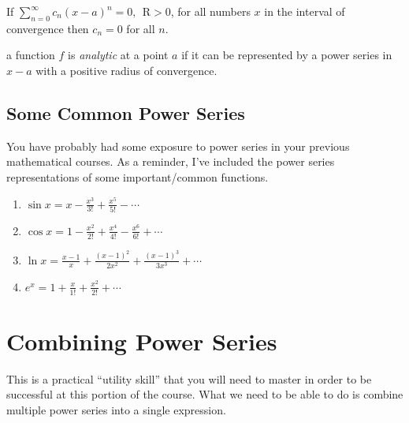 \begin{definition}
If $\sum\limits_{n=0}^{\infty}c_n(x-a)^n=0, \ \ \text{R}>0$, for all numbers $x$ in the interval of convergence then $c_n=0$ for all $n$.
\end{definition}


\begin{definition}
a function $f$ is \emph{analytic} at a point $a$ if it can be represented by a power series in $x-a$ with a positive radius of convergence.
\end{definition}

\subsection{Some Common Power Series}
You have probably had some exposure to power series in your previous mathematical courses.  As a reminder, I've included the power series representations of some important/common functions.

\begin{enumerate}

\item $\sin{x} = x - \frac{x^3}{3!} + \frac{x^5}{5!} - \cdots$

\item $\cos{x} = 1 - \frac{x^2}{2!} + \frac{x^4}{4!} - \frac{x^6}{6!} + \cdots$

\item $\ln{x} = \frac{x-1}{x} + \frac{(x-1)^2}{2x^2} + \frac{(x-1)^3}{3x^3} + \cdots$ 

\item $e^x = 1 + \frac{x}{1!} + \frac{x^2}{2!} + \cdots$
\end{enumerate}


\section{Combining Power Series}
This is a practical ``utility skill'' that you will need to master in order to be successful at this portion of the course.  What we need to be able to do is combine multiple power series into a single expression.  


